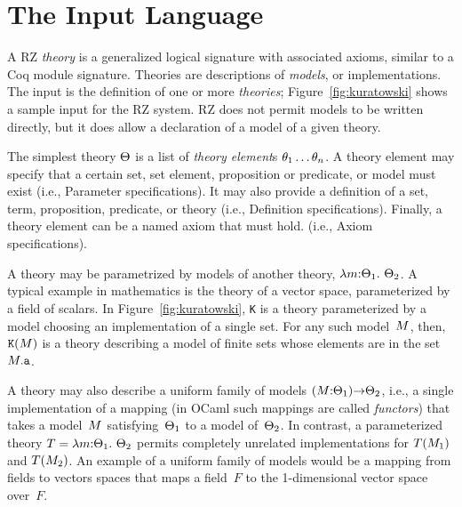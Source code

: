 
\section{The Input Language}
\label{sec:input-language}

A RZ \emph{theory} is a generalized logical signature with associated
axioms, similar to a Coq module signature. Theories are descriptions
of \emph{models}, or implementations. The input is the definition of
one or more \emph{theories}; Figure~\ref{fig:kuratowski} shows a
sample input for the RZ system. RZ does not permit models to be
written directly, but it does allow a declaration of a model of a
given theory.

The simplest theory $\Theta$ is a list of \emph{theory element}\/s
$\theta_1 \ldots \theta_n$. A theory element may specify that a certain
set, set element, proposition or predicate, or model must exist (i.e.,
\textsf{Parameter} specifications). It may also provide a definition
of a set, term, proposition, predicate, or theory (i.e.,
\textsf{Definition} specifications). Finally, a theory element can be
a named axiom that must hold. (i.e., \textsf{Axiom} specifications).

A theory may be parametrized by models of another theory,
$\lambda m{:}\Theta_1.\ \Theta_2$. A typical example in mathematics is
the theory of a vector space, parameterized by a field of scalars. In
Figure~\ref{fig:kuratowski}, \texttt{K} is a theory parameterized by a
model choosing an implementation of a single set. For any such
model~$M$, then, $\mathtt{K}(M)$ is a theory describing a model of
finite sets whose elements are in the set $M{.}\mathtt{a}$.

A theory may also describe a uniform family of models
$(M{:}\Theta_1){\to}\Theta_2$, i.e., a single implementation of a
mapping (in OCaml such mappings are called \emph{functors}) that takes
a model~$M$ satisfying~$\Theta_1$ to a model of~$\Theta_2$. In contrast,
a parameterized theory $T = \lambda m{:}\Theta_1.\ \Theta_2$ permits
completely unrelated implementations for $T(M_1)$ and $T(M_2)$. An
example of a uniform family of models would be a mapping from fields
to vectors spaces that maps a field~$F$ to the 1-dimensional vector
space over~$F$.


